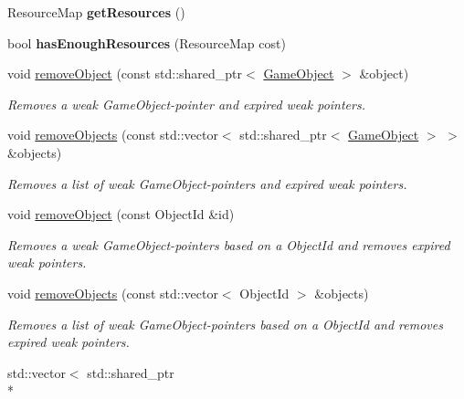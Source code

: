 \begin{DoxyCompactItemize}
\item 
\hypertarget{class_course_1_1_player_base_ab94779846505a4df06790a94eff11625}{Resource\-Map {\bfseries get\-Resources} ()}\label{class_course_1_1_player_base_ab94779846505a4df06790a94eff11625}

\item 
\hypertarget{class_course_1_1_player_base_ac2e9dc1a965dd15a2393e0cb6b4b67af}{bool {\bfseries has\-Enough\-Resources} (Resource\-Map cost)}\label{class_course_1_1_player_base_ac2e9dc1a965dd15a2393e0cb6b4b67af}

\item 
void \hyperlink{class_course_1_1_player_base_ab2de2a65c8662b73589a806bed85eb62}{remove\-Object} (const std\-::shared\-\_\-ptr$<$ \hyperlink{class_course_1_1_game_object}{Game\-Object} $>$ \&object)
\begin{DoxyCompactList}\small\item\em Removes a weak Game\-Object-\/pointer and expired weak pointers. \end{DoxyCompactList}\item 
void \hyperlink{class_course_1_1_player_base_a0a95de14cef530b9274c3aa37265bf24}{remove\-Objects} (const std\-::vector$<$ std\-::shared\-\_\-ptr$<$ \hyperlink{class_course_1_1_game_object}{Game\-Object} $>$ $>$ \&objects)
\begin{DoxyCompactList}\small\item\em Removes a list of weak Game\-Object-\/pointers and expired weak pointers. \end{DoxyCompactList}\item 
void \hyperlink{class_course_1_1_player_base_ac0b3430fe8c7e1f47947d66c87df757c}{remove\-Object} (const Object\-Id \&id)
\begin{DoxyCompactList}\small\item\em Removes a weak Game\-Object-\/pointers based on a Object\-Id and removes expired weak pointers. \end{DoxyCompactList}\item 
void \hyperlink{class_course_1_1_player_base_aea9bc90c473e8bc94788118adbea6505}{remove\-Objects} (const std\-::vector$<$ Object\-Id $>$ \&objects)
\begin{DoxyCompactList}\small\item\em Removes a list of weak Game\-Object-\/pointers based on a Object\-Id and removes expired weak pointers. \end{DoxyCompactList}\item 
std\-::vector$<$ std\-::shared\-\_\-ptr\\*

\end{DoxyCompactItemize}
